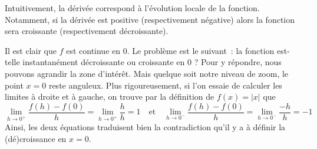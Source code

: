 Intuitivement, la dérivée correspond à l'évolution locale de la fonction. Notamment, si la dérivée est positive (respectivement négative) alors la fonction sera croissante (respectivement décroissante).

Il est clair que $f$ est continue en $0$. Le problème est le suivant~: la fonction est-telle instantanément décroissante ou croissante en $0$ ? Pour y répondre, nous pouvons agrandir la zone d'intérêt. Mais quelque soit notre niveau de zoom, le point $x = 0$ reste anguleux. Plus rigoureusement, si l'on essaie de calculer les limites à droite et à gauche, on trouve par la définition de $f(x) = |x|$ que
\begin{equation}
\lim_{h \to 0^+} \frac{f(h) - f(0)}{h} = \lim_{h \to 0^+} \frac{h}{h} = 1 \quad \textrm{et} \quad \lim_{h \to 0^-} \frac{f(h)-f(0)}{h} = \lim_{h \to 0^-} \frac{-h}{h} = -1
\end{equation}
Ainsi, les deux équations traduisent bien la contradiction qu'il y a à définir la (dé)croissance en $x = 0$.


    
    




    

